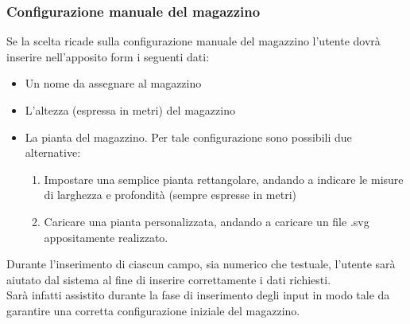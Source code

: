         
        \subsubsection{Configurazione manuale del magazzino}\label{sec:creazione:configurazione}
            Se la scelta ricade sulla configurazione manuale del magazzino l'utente dovrà inserire nell'apposito form i seguenti dati: 
            \begin{itemize}
                \item Un nome da assegnare al magazzino
                \item L'altezza (espressa in metri) del magazzino
                \item La pianta del magazzino. Per tale configurazione sono possibili due alternative:
                \begin{enumerate}
                    \item Impostare una semplice pianta rettangolare, andando a indicare le misure di larghezza e profondità (sempre espresse in metri)
                    \item Caricare una pianta personalizzata, andando a caricare un file .svg appositamente realizzato. 
                \end{enumerate}
            \end{itemize}
            Durante l'inserimento di ciascun campo, sia numerico che testuale, l'utente sarà aiutato dal sistema al fine di inserire correttamente i dati richiesti.\\
            Sarà infatti assistito durante la fase di inserimento degli input in modo tale da garantire una corretta configurazione iniziale del magazzino.
